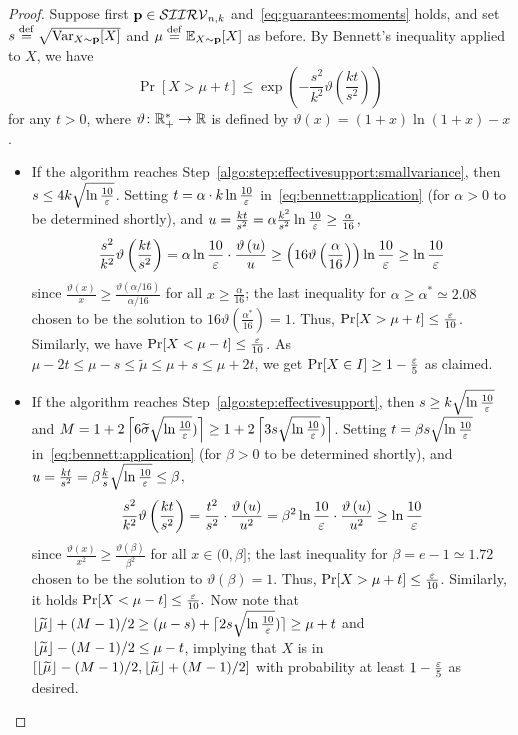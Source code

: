 \begin{proof}Suppose first $\p\in\classksiirv[n]{k}$ and~\eqref{eq:guarantees:moments} holds, and set $s\eqdef \sqrt{\var_{X\sim\p}[X]}$ and $\mu\eqdef \shortexpect_{X\sim\p}[X]$ as before. By Bennett's inequality applied to $X$, we have
  \begin{equation}\label{eq:bennett:application}
    \Pr[ X > \mu+t ] \leq \exp\left(- \frac{s^2}{k^2} \vartheta\left( \frac{kt}{s^2} \right) \right)
  \end{equation}
  for any $t>0$, where $\vartheta\colon\R_+^\ast\to\R$ is defined by $\vartheta(x) = (1+x)\ln(1+x)-x$.
\begin{itemize}
  \item If the algorithm reaches Step~\ref{algo:step:effectivesupport:smallvariance}, then $s\leq 4k \sqrt{\ln\frac{10}{\eps}}$. Setting $t=\alpha\cdot k \ln\frac{10}{\eps}$ in~\cref{eq:bennett:application} (for $\alpha>0$ to be determined shortly), and $u = \frac{kt}{s^2} = \alpha\frac{k^2}{s^2}\ln\frac{10}{\eps} \geq \frac{\alpha}{16}$, 
  \[
      \frac{s^2}{k^2} \vartheta\left( \frac{kt}{s^2} \right) = \alpha\ln\frac{10}{\eps} \cdot \frac{\vartheta\left( u \right)}{u}
      \geq \left(16\vartheta\left( \frac{\alpha}{16} \right)\right) \ln\frac{10}{\eps} \geq \ln\frac{10}{\eps}
  \]
  since $\frac{\vartheta\left(x\right)}{x} \geq \frac{\vartheta\left(\alpha/16\right)}{\alpha/16}$ for all $x\geq \frac{\alpha}{16}$; the last inequality for $\alpha\geq \alpha^\ast \simeq 2.08$ chosen to be the solution to $16\vartheta\left( \frac{\alpha^\ast}{16} \right)=1$. Thus, $\Pr[X > \mu+t] \leq \frac{\eps}{10}$. Similarly, we have $\Pr[ X < \mu-t ] \leq \frac{\eps}{10}$.
  As $\mu-2t\leq\mu-s\leq \widetilde{\mu} \leq \mu+s \leq \mu +2t$, we get $\Pr[ X \in I ] \geq 1-\frac{\eps}{5}$ as claimed.

  \item If the algorithm reaches Step~\ref{algo:step:effectivesupport}, then $s\geq k \sqrt{\ln\frac{10}{\eps}}$ and $M = 1+2\clg{ 6\widetilde{\sigma}\sqrt{\ln\frac{10}{\eps}}) } \geq 1+2\clg{ 3s\sqrt{\ln\frac{10}{\eps}}) }$. Setting $t=\beta s \sqrt{ \ln\frac{10}{\eps}}$ in~\cref{eq:bennett:application} (for $\beta>0$ to be determined shortly), and $u = \frac{kt}{s^2} = \beta\frac{k}{s}\sqrt{ \ln\frac{10}{\eps}}\leq \beta$, 
  \[
      \frac{s^2}{k^2} \vartheta\left( \frac{kt}{s^2} \right) = \frac{t^2}{s^2} \cdot \frac{\vartheta\left( u \right)}{u^2}
      = \beta^2\ln\frac{10}{\eps}\cdot \frac{\vartheta\left(u\right)}{u^2} \geq \ln\frac{10}{\eps}
  \]
  since $\frac{\vartheta\left(x\right)}{x^2} \geq \frac{\vartheta\left(\beta\right)}{\beta^2}$ for all $x\in(0,\beta]$; the last inequality for $\beta= e-1 \simeq 1.72$ chosen to be the solution to $\vartheta\left( \beta \right)=1$. Thus, $\Pr[X > \mu+t] \leq \frac{\eps}{10}$. Similarly, it holds $\Pr[ X < \mu-t ] \leq \frac{\eps}{10}.$
Now note that $ \lfloor\widetilde{\mu} \rfloor+(M-1)/2 \geq (\mu-s)+\lceil 2s\sqrt{\ln\frac{10}{\eps}}) \rceil \geq \mu + t$
and $\flr{ \widetilde{\mu} } - (M-1)/2 \leq \mu-t$, implying that $X$ is in $[\flr{ \widetilde{\mu} }-(M-1)/2, \flr{ \widetilde{\mu} }+(M-1)/2]$ with probability at least $1- \frac{\eps}{5}$ as desired.
\end{itemize}


\end{proof}
